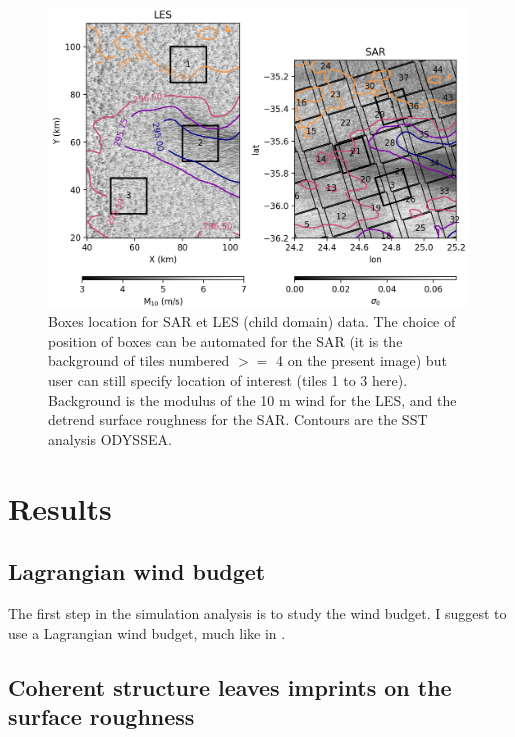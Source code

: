 \documentclass[draft]{agujournal2019} %
\begin{document}
            \begin{figure}[h!]
                \centering
                \includegraphics[width=0.99\textwidth]{Boxe_location_SAR_LES.png}
                \caption{Boxes location for SAR et LES (child domain) data. The choice of position of boxes can be automated for the SAR (it is the background of tiles numbered $>=$ 4 on the present image) but user can still specify location of interest (tiles 1 to 3 here). Background is the modulus of the 10 m wind for the LES, and the detrend surface roughness for the SAR. Contours are the SST analysis ODYSSEA.}
                \label{boxe_location}
            \end{figure} 
            
		\section{Results}
		\label{section_results}

            \subsection{Lagrangian wind budget}
            \label{subsection_wind_budget}

            The first step in the simulation analysis is to study the wind budget. I suggest to use a Lagrangian wind budget, much like in . 

            \subsection{Coherent structure leaves imprints on the surface roughness}
            \label{subsection_CS_imprints_sigma0}
\end{document}
